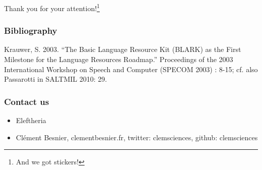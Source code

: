 \documentclass{beamer}
\begin{document}
\begin{frame}
\begin{center}
    Thank you for your attention!\footnote{{And we got stickers! \footnotesize}}
\end{center}




\end{frame}


\begin{frame}

\frametitle{Bibliography}
Krauwer, S. 2003. “The Basic Language Resource Kit (BLARK) as the First Milestone for the Language Resources Roadmap.” Proceedings of the 2003 International Workshop on Speech and Computer (SPECOM 2003) : 8-15; cf. also Passarotti in SALTMIL 2010: 29.

\end{frame}


\begin{frame}
\frametitle{Contact us}

\begin{itemize}
\item Eleftheria
\item Clément Besnier, clementbesnier.fr, twitter: clemsciences, github: clemsciences
\end{itemize}

\end{frame}











\end{document}
